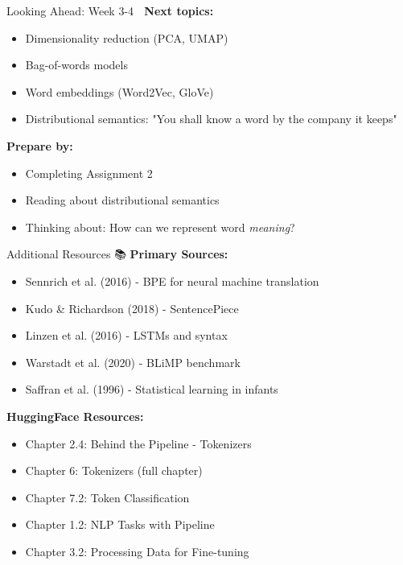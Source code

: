 \documentclass[aspectratio=169]{beamer}
\begin{document}
\begin{frame}[shrink=10]{Looking Ahead: Week 3-4 🔮}
    \textbf{Next topics:}
    \begin{itemize}\setlength{\itemsep}{0pt}
        \item Dimensionality reduction (PCA, UMAP)
        \item Bag-of-words models
        \item Word embeddings (Word2Vec, GloVe)
        \item Distributional semantics: "You shall know a word by the company it keeps"
    \end{itemize}

    \vspace{1em}
    \textbf{Prepare by:}
    \begin{itemize}\setlength{\itemsep}{0pt}
        \item Completing Assignment 2
        \item Reading about distributional semantics
        \item Thinking about: How can we represent word \textit{meaning}?
    \end{itemize}
\end{frame}

\begin{frame}[shrink=10]{Additional Resources 📚}
    \textbf{Primary Sources:}
    \begin{itemize}\setlength{\itemsep}{0pt}
        \item Sennrich et al. (2016) - BPE for neural machine translation
        \item Kudo \& Richardson (2018) - SentencePiece
        \item Linzen et al. (2016) - LSTMs and syntax
        \item Warstadt et al. (2020) - BLiMP benchmark
        \item Saffran et al. (1996) - Statistical learning in infants
    \end{itemize}

    \vspace{0.5em}
    \textbf{HuggingFace Resources:}
    \begin{itemize}\setlength{\itemsep}{0pt}
        \item Chapter 2.4: Behind the Pipeline - Tokenizers
        \item Chapter 6: Tokenizers (full chapter)
        \item Chapter 7.2: Token Classification
        \item Chapter 1.2: NLP Tasks with Pipeline
        \item Chapter 3.2: Processing Data for Fine-tuning
    \end{itemize}
\end{frame}
\end{document}
